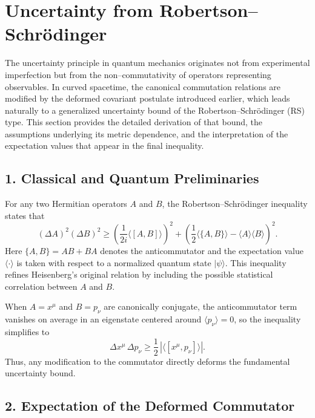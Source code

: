 \documentclass[11pt,oneside]{book}
\numberwithin{equation}{chapter}
\begin{document}
\clearpage
\section{Uncertainty from Robertson–Schrödinger}

The uncertainty principle in quantum mechanics originates not from experimental
imperfection but from the non--commutativity of operators representing
observables.  
In curved spacetime, the canonical commutation relations are modified by
the deformed covariant postulate introduced earlier, which leads naturally
to a generalized uncertainty bound of the Robertson--Schrödinger (RS) type.
This section provides the detailed derivation of that bound, the assumptions
underlying its metric dependence, and the interpretation of the expectation
values that appear in the final inequality.

\subsection*{1. Classical and Quantum Preliminaries}

For any two Hermitian operators $A$ and $B$, the
Robertson--Schrödinger inequality states that
\begin{equation}
(\Delta A)^2 (\Delta B)^2
\ge \left(\frac{1}{2i}\langle [A,B]\rangle\right)^2
+ \left(\frac{1}{2}\langle \{A,B\}\rangle
      - \langle A\rangle \langle B\rangle\right)^2.
\end{equation}
Here $\{A,B\}=AB+BA$ denotes the anticommutator and the expectation value
$\langle\cdot\rangle$ is taken with respect to a normalized quantum state
$|\psi\rangle$.  
This inequality refines Heisenberg’s original relation by including
the possible statistical correlation between $A$ and $B$.

When $A=x^\mu$ and $B=p_\nu$ are canonically conjugate, the anticommutator term
vanishes on average in an eigenstate centered around $\langle p_\nu\rangle=0$,
so the inequality simplifies to
\begin{equation}
\Delta x^\mu\,\Delta p_\nu
\ge
\frac{1}{2}\,|\langle[x^\mu,p_\nu]\rangle|.
\end{equation}
Thus, any modification to the commutator directly deforms the fundamental
uncertainty bound.

\subsection*{2. Expectation of the Deformed Commutator}
\end{document}
